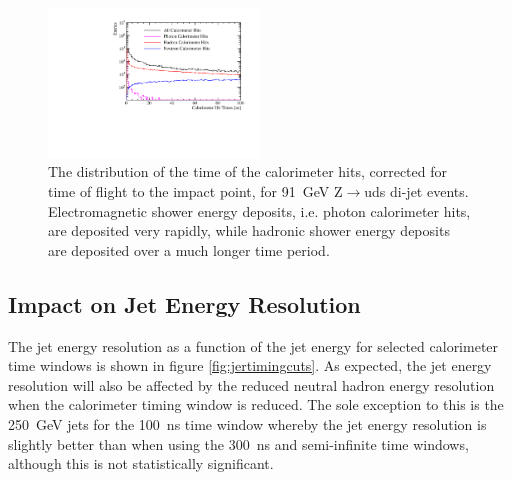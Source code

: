 \begin{figure}[h!]
\centering
\includegraphics[width=0.5\textwidth]{OptimisationStudies/Plots/Description/CalorimeterHitTimes_91GeV_Z_uds_Steel.pdf}
\caption[The distribution of the time of the calorimeter hits, corrected for time of flight to the impact point, for 91~GeV Z$\rightarrow$uds di-jet events.  Electromagnetic shower energy deposits, i.e. photon calorimeter hits, are deposited very rapidly, while hadronic shower energy deposits are deposited over a much longer time period.]{The distribution of the time of the calorimeter hits, corrected for time of flight to the impact point, for 91~GeV Z$\rightarrow$uds di-jet events.  Electromagnetic shower energy deposits, i.e. photon calorimeter hits, are deposited very rapidly, while hadronic shower energy deposits are deposited over a much longer time period.}
\label{fig:calohittiming}
\end{figure} 


\subsection{Impact on Jet Energy Resolution}
The jet energy resolution as a function of the jet energy for selected calorimeter time windows is shown in figure \ref{fig:jertimingcuts}.  As expected, the jet energy resolution will also be affected by the reduced neutral hadron energy resolution when the calorimeter timing window is reduced.  The sole exception to this is the 250~GeV jets for the 100~ns time window whereby the jet energy resolution is slightly better than when using the 300~ns and semi-infinite time windows, although this is not statistically significant.  

